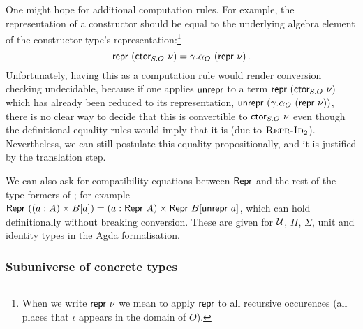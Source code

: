 One might hope for additional computation rules. For example, the representation
of a constructor should be equal to the underlying algebra element of the
constructor type's representation:\footnote{When we write $\Mrepr\ \nu$ we mean
to apply $\textsf{repr}$ to all recursive occurences (all places that $\iota$ appears
in the domain of $O$).} \[\textsf{repr}\ (\textsf{ctor}_{S.O}\ \nu) = \gamma.\alpha_O\ (\textsf{repr}
\ \nu) \,.\] Unfortunately, having this as a computation rule would render
conversion checking undecidable, because if one applies $\textsf{unrepr}$ to a term
$\textsf{repr}\ (\textsf{ctor}_{S.O}\ \nu)$ which has already been reduced to its
representation, $\mta{unrepr}\ (\gamma.\alpha_O\ (\Mrepr\ \nu))$, there is no
clear way to decide that this is convertible to $\textsf{ctor}_{S.O}\ \nu$ even though
the definitional equality rules would imply that it is (due to
\hyperlink{Repr-Id2}{$\textsc{Repr-Id}_2$}). Nevertheless, we can still postulate this equality
propositionally, and it is justified by the translation step.

We can also ask for compatibility equations between $\textsf{Repr}$ and the rest of
the type formers of \lambdamltt; for example $\textsf{Repr}\ ((a : A) \times B[a]) = (a
: \textsf{Repr}\ A) \times \textsf{Repr}\ B[\textsf{unrepr}\ a]$, which can hold definitionally
without breaking conversion. These are given for $\mathcal{U}$, $\Pi$, $\Sigma$, unit
and identity types in the Agda formalisation.


\subsubsection{Subuniverse of concrete types}

